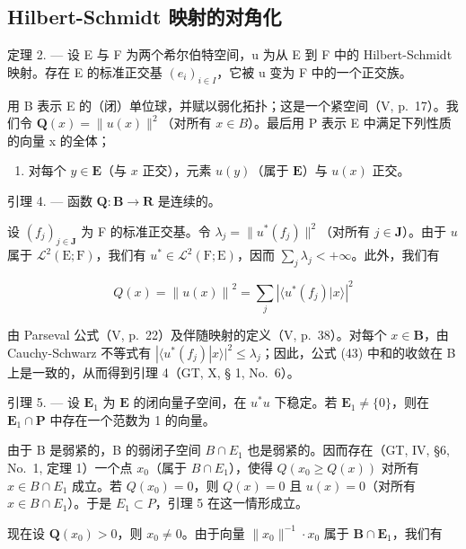 \subsection{Hilbert-Schmidt 映射的对角化}

定理 2. --- 设 E 与 F 为两个希尔伯特空间，u 为从 E 到 F 中的 Hilbert-Schmidt 映射。存在 E 的标准正交基 \((e_{i})_{i\in I}\)，它被 u 变为 F 中的一个正交族。

用 B 表示 E 的（闭）单位球，并赋以弱化拓扑；这是一个紧空间（V, p.~17）。我们令 \(\mathbf{Q}(x) = \|u(x)\|^{2}\)（对所有 \(x \in B\)）。最后用 P 表示 E 中满足下列性质的向量 x 的全体；

\begin{enumerate}
\def\labelenumi{(\Alph{enumi})}
\setcounter{enumi}{7}
\tightlist
\item
  对每个 \(y \in \mathbf{E}\)（与 \(x\) 正交），元素 \(u(y)\)（属于 \(\mathbf{E}\)）与 \(u(x)\) 正交。
\end{enumerate}

引理 4. --- 函数 \(\mathbf{Q}:\mathbf{B}\to \mathbf{R}\) 是连续的。

设 \((f_j)_{j\in \mathbf{J}}\) 为 F 的标准正交基。令 \(\lambda_{j} = \| u^{*}(f_{j})\|^{2}\)（对所有 \(j\in \mathbf{J}\)）。由于 \(u\) 属于 \(\mathcal{L}^2 (\mathrm{E};\mathrm{F})\)，我们有 \(u^{*}\in \mathcal{L}^{2}(\mathrm{F};\mathrm{E})\)，因而 \(\sum_{j}\lambda_{j} < + \infty\)。此外，我们有

\[
Q (x) = \left\| u (x) \right\| ^ {2} = \sum_ {j} \left| \langle u ^ {*} (f _ {j}) | x \rangle \right| ^ {2}\tag{43}
\]

由 Parseval 公式（V, p.~22）及伴随映射的定义（V, p.~38）。对每个 \(x \in \mathbf{B}\)，由 Cauchy-Schwarz 不等式有 \(|\langle u^{*}(f_{j})|x\rangle|^{2} \leqslant \lambda_{j}\)；因此，公式 (43) 中和的收敛在 B 上是一致的，从而得到引理 4（GT, X, § 1, No.~6）。

引理 5. --- 设 \(\mathbf{E}_1\) 为 \(\mathbf{E}\) 的闭向量子空间，在 \(u^*u\) 下稳定。若 \(\mathbf{E}_1 \neq \{0\}\)，则在 \(\mathbf{E}_1 \cap \mathbf{P}\) 中存在一个范数为 1 的向量。

由于 B 是弱紧的，B 的弱闭子空间 \(B \cap E_{1}\) 也是弱紧的。因而存在（GT, IV, §6, No.~1, 定理 1）一个点 \(x_{0}\)（属于 \(B \cap E_{1}\)），使得 \(Q(x_{0} \geqslant Q(x))\) 对所有 \(x \in B \cap E_{1}\) 成立。若 \(Q(x_{0}) = 0\)，则 \(Q(x) = 0\) 且 \(u(x) = 0\)（对所有 \(x \in B \cap E_{1}\)）。于是 \(E_{1} \subset P\)，引理 5 在这一情形成立。

现在设 \(\mathbf{Q}(x_0) > 0\)，则 \(x_0 \neq 0\)。由于向量 \(\| x_0 \|^{-1} \cdot x_0\) 属于 \(\mathbf{B} \cap \mathbf{E}_1\)，我们有

